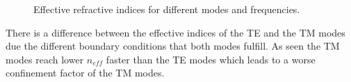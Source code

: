 \begin{figure}[h]%
\centering
\caption{Effective refractive indices for different modes and frequencies.}%
\label{fig:1_neff}%
\end{figure}

There is a difference between the effective indices of the TE and the TM modes due the different boundary conditions that both modes fulfill. As seen the TM modes reach lower $n_{eff}$ faster than the TE modes which leads to a worse confinement factor of the TM modes.

